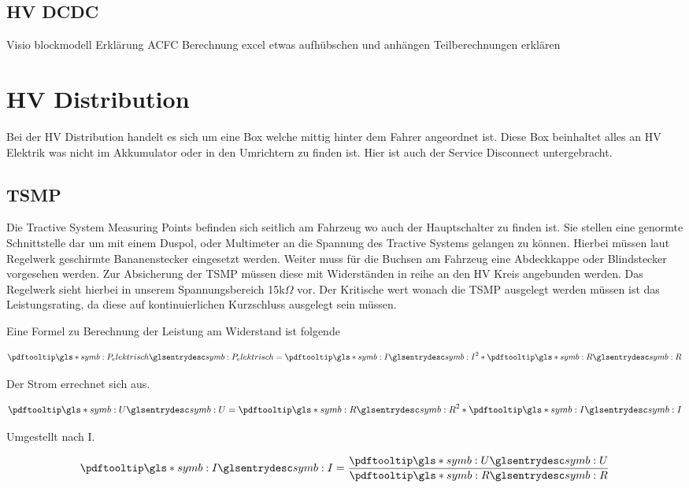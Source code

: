 \FloatBarrier
\subsection{HV DCDC}
Visio blockmodell
Erklärung ACFC
Berechnung excel etwas aufhübschen und anhängen
Teilberechnungen erklären

\FloatBarrier
\section{HV Distribution}
Bei der HV Distribution handelt es sich um eine Box welche mittig hinter dem Fahrer angeordnet ist. Diese Box beinhaltet alles an HV Elektrik was nicht im Akkumulator oder in den Umrichtern zu finden ist. Hier ist auch der Service Disconnect untergebracht.

\FloatBarrier
\subsection{TSMP}
Die Tractive System Measuring Points befinden sich seitlich am Fahrzeug wo auch der Hauptschalter zu finden ist. Sie stellen eine genormte Schnittstelle dar um mit einem Duspol, oder Multimeter an die Spannung des Tractive Systems gelangen zu können. Hierbei müssen laut Regelwerk geschirmte Bananenstecker eingesetzt werden. Weiter muss für die Buchsen am Fahrzeug eine Abdeckkappe oder Blindstecker vorgesehen werden. Zur Absicherung der TSMP müssen diese mit Widerständen in reihe an den HV Kreis angebunden werden. Das Regelwerk sieht hierbei in unserem Spannungsbereich 15k$\Omega$ vor. Der Kritische wert wonach die TSMP ausgelegt werden müssen ist das Leistungsrating, da diese auf kontinuierlichen Kurzschluss ausgelegt sein müssen.

Eine Formel zu Berechnung der Leistung am Widerstand ist folgende

\begin{equation}
	\label{eqn:Leistung am Wiederstand}
	\glsc{symb:P_elektrisch} = \glsc{symb:I}^{2} * \glsc{symb:R}
\end{equation}

Der Strom errechnet sich aus.

\begin{equation}
	\label{eqn:URI}
	\glsc{symb:U} = \glsc{symb:R}^{2} * \glsc{symb:I}
\end{equation}

Umgestellt nach I.

\begin{equation}
	\label{eqn:IUR}
	\glsc{symb:I} = \dfrac{\glsc{symb:U}} {\glsc{symb:R}}
\end{equation}

